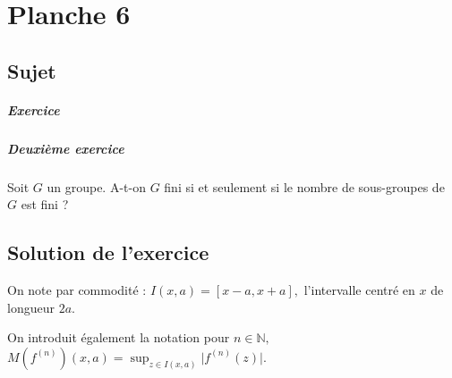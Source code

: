 \chapter{Planche 6}

\section{Sujet}


\paragraph{Exercice}

\paragraph{Deuxième exercice}
Soit $G$ un groupe. A-t-on $G$ fini si et seulement si le nombre de sous-groupes de $G$ est fini ?



\section{Solution de l'exercice}

On note par commodité : $\displaystyle I(x,a)=[x-a,x+a],$ l'intervalle centré en $x$ de longueur $2a.$

On introduit également la notation pour $n\in \mathbb{N},$ $\displaystyle M(f^{(n)})(x,a)=\sup_{z\in I(x,a)}\vert f^{(n)}(z)\vert.$

